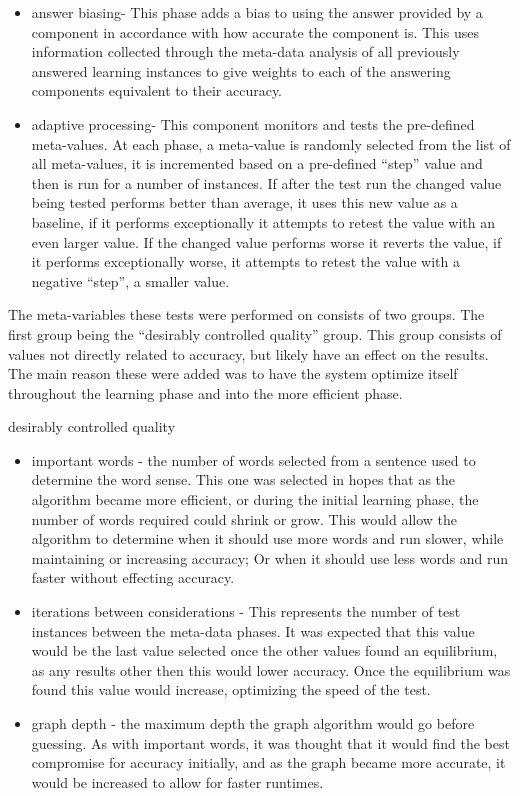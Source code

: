 \begin{itemize}
\item answer biasing- This phase adds a bias to using the answer provided by a 
component in accordance with how accurate the component is.  This uses 
information collected through the meta-data analysis of all previously answered 
learning instances to give weights to each of the answering components 
equivalent to their accuracy.     
\item adaptive processing- This component monitors and tests the pre-defined 
meta-values.  At each phase, a meta-value is randomly selected from the list of 
all meta-values, it is incremented based on a pre-defined ``step'' value and 
then is run for a number of instances. If after the test run the changed value 
being tested performs better than average, it uses this new value as a baseline, 
if it performs exceptionally it attempts to retest the value with an even larger 
value.  If the changed value performs worse it reverts the value, if it performs 
exceptionally worse, it attempts to retest the value with a negative ``step'', a 
smaller value. 
\end{itemize}

The meta-variables these tests were performed on consists of two groups. The
first group being the ``desirably controlled quality'' group.  This group
consists of values not directly related to accuracy, but likely have an effect
on the results.  The main reason these were added was to have the system
optimize itself throughout the learning phase and into the more efficient phase.

desirably controlled quality 

\begin{itemize}
\item important words - the number of words selected from a sentence used to 
determine the word sense. This one was selected in hopes that as the algorithm 
became more efficient, or during the initial learning phase, the number of words 
required could shrink or grow. This would allow the algorithm to determine when 
it should use more words and run slower, while maintaining or increasing 
accuracy; Or when it should use less words and run faster without effecting 
accuracy.     

\item iterations between considerations - This represents the number of test 
instances between the meta-data phases. It was expected that this value would be
 the last value selected once the other values found an equilibrium, as any 
 results other then this would lower accuracy. Once the equilibrium was found 
 this value would increase, optimizing the speed of the test.     
\item graph depth - the maximum depth the graph algorithm would go before 
guessing.  As with important words, it was thought that it would find the best 
compromise for accuracy initially, and as the graph became more accurate, it 
would be increased to allow for faster
runtimes.

\end{itemize}


